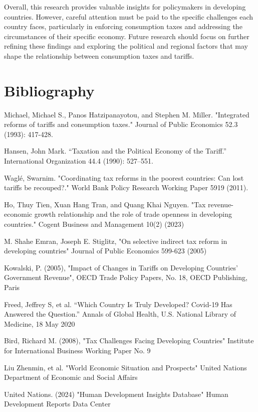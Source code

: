 \documentclass[12pt]{article}
\begin{document}
Overall, this research provides valuable insights for policymakers in developing countries. However, careful attention must be paid to the specific challenges each country faces, particularly in enforcing consumption taxes and addressing the circumstances of their specific economy. Future research should focus on further refining these findings and exploring the political and regional factors that may shape the relationship between consumption taxes and tariffs.



\newpage
\section*{Bibliography}
\singlespacing
\setlength\bibsep{0pt}

Michael, Michael S., Panos Hatzipanayotou, and Stephen M. Miller. "Integrated reforms of tariffs and consumption taxes." Journal of Public Economics 52.3 (1993): 417-428.

Hansen, John Mark. “Taxation and the Political Economy of the Tariff.” International Organization 44.4 (1990): 527–551.

Waglé, Swarnim. "Coordinating tax reforms in the poorest countries: Can lost tariffs be recouped?." World Bank Policy Research Working Paper 5919 (2011).

Ho, Thuy Tien, Xuan Hang Tran, and Quang Khai Nguyen. "Tax revenue-economic growth relationship and the role of trade openness in developing countries." Cogent Business and Management 10(2) (2023)

M. Shahe Emran, Joseph E. Stiglitz, "On selective indirect tax reform in developing countries" Journal of Public Economics 599-623 (2005)

Kowalski, P. (2005), "Impact of Changes in Tariffs on Developing Countries' Government Revenue", OECD Trade Policy Papers, No. 18, OECD Publishing, Paris

Freed, Jeffrey S, et al. “Which Country Is Truly Developed? Covid-19 Has Answered the Question.” Annals of Global Health, U.S. National Library of Medicine, 18 May 2020

Bird, Richard M. (2008), "Tax Challenges Facing Developing Countries" Institute for International Business Working Paper No. 9

Liu Zhenmin, et al. "World Economic Situation and Prospects" United Nations Department of Economic and Social Affairs

United Nations. (2024) "Human Development Insights Database" Human Development Reports Data Center
\end{document}
